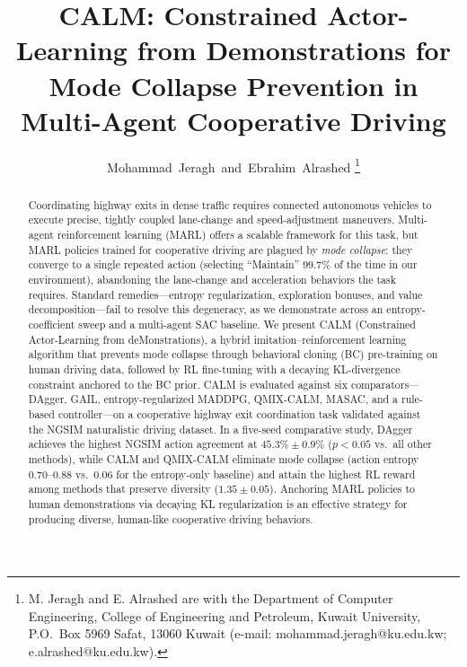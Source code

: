 \documentclass[journal]{IEEEtran}
\begin{document}
\title{CALM: Constrained Actor-Learning from Demonstrations for Mode Collapse Prevention in Multi-Agent Cooperative Driving}

\author{Mohammad~Jeragh~and~Ebrahim~Alrashed%
\thanks{M. Jeragh and E. Alrashed are with the Department of Computer Engineering, College of Engineering and Petroleum, Kuwait University, P.O.~Box 5969 Safat, 13060 Kuwait (e-mail: mohammad.jeragh@ku.edu.kw; e.alrashed@ku.edu.kw).}}

\maketitle

\begin{abstract}
Coordinating highway exits in dense traffic requires connected autonomous vehicles to execute precise, tightly coupled lane-change and speed-adjustment maneuvers. Multi-agent reinforcement learning (MARL) offers a scalable framework for this task, but MARL policies trained for cooperative driving are plagued by \emph{mode collapse}: they converge to a single repeated action (selecting ``Maintain'' $99.7\%$ of the time in our environment), abandoning the lane-change and acceleration behaviors the task requires. Standard remedies---entropy regularization, exploration bonuses, and value decomposition---fail to resolve this degeneracy, as we demonstrate across an entropy-coefficient sweep and a multi-agent SAC baseline. We present CALM (Constrained Actor-Learning from deMonstrations), a hybrid imitation--reinforcement learning algorithm that prevents mode collapse through behavioral cloning (BC) pre-training on human driving data, followed by RL fine-tuning with a decaying KL-divergence constraint anchored to the BC prior. CALM is evaluated against six comparators---DAgger, GAIL, entropy-regularized MADDPG, QMIX-CALM, MASAC, and a rule-based controller---on a cooperative highway exit coordination task validated against the NGSIM naturalistic driving dataset. In a five-seed comparative study, DAgger achieves the highest NGSIM action agreement at $45.3\% \pm 0.9\%$ ($p < 0.05$ vs.\ all other methods), while CALM and QMIX-CALM eliminate mode collapse (action entropy $0.70$--$0.88$ vs.\ $0.06$ for the entropy-only baseline) and attain the highest RL reward among methods that preserve diversity ($1.35 \pm 0.05$). Anchoring MARL policies to human demonstrations via decaying KL regularization is an effective strategy for producing diverse, human-like cooperative driving behaviors.
\end{abstract}
\end{document}
